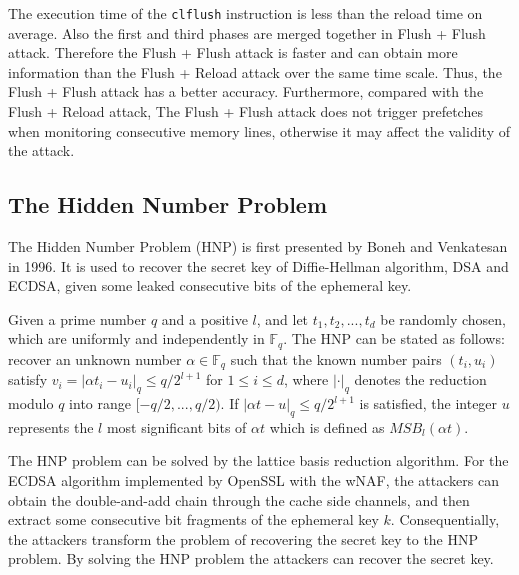 The execution time of the \verb+clflush+ instruction is less than the reload time on average.
    Also the first and third phases are merged together in Flush + Flush attack.
  Therefore the Flush + Flush attack is faster and can obtain more information than the Flush + Reload attack over the same time scale.
Thus, the Flush + Flush attack has a better accuracy.
Furthermore, compared with the Flush + Reload attack,
The Flush + Flush attack does not trigger prefetches when monitoring consecutive memory lines, otherwise it may affect the validity of the attack.




\subsection{The Hidden Number Problem}
\label{intro_hnp}
The Hidden Number Problem (HNP) is first presented by Boneh and Venkatesan \cite{boneh1996} in 1996.
It is used to recover the secret key of Diffie-Hellman algorithm, DSA and ECDSA, given some leaked consecutive bits of the ephemeral key.

Given a prime number $q$ and a positive $l$,
 and let $t_1, t_2, ..., t_d$ be randomly chosen, which are uniformly and independently in $\mathbb{F}_q$.
The HNP can be stated as follows:
  recover an unknown number $\alpha \in \mathbb{F}_q$ such that the known number pairs $(t_i, u_i)$ satisfy $v_i = |\alpha t_i - u_i|_{q} \leq q/2^{l+1}$ for $1 \leq i \leq d$,
   where $|\cdot|_q$ denotes the reduction modulo $q$ into range $[-q/2, ..., q/2)$.
If $|\alpha t - u|_{q} \leq q/2^{l+1}$ is satisfied,
the integer $u$ represents the $l$ most significant bits of $\alpha t$ which is defined as ${MSB}_l(\alpha t)$.

The HNP problem can be solved by the lattice basis reduction algorithm.
For the ECDSA algorithm implemented by OpenSSL with the wNAF,
  the attackers can obtain the double-and-add chain through the cache side channels,
    and then extract some consecutive bit fragments of the ephemeral key $k$.
Consequentially, the attackers transform the problem of recovering the secret key to the HNP problem.
 By solving the HNP problem the attackers can recover the secret key.

